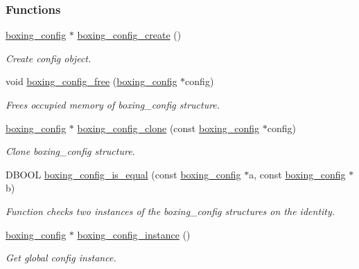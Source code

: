 \subsubsection*{Functions}
\begin{DoxyCompactItemize}
\item 
\hyperlink{structboxing__config__s}{boxing\_\-config} $\ast$ \hyperlink{group__config_ga244626b48bf3730a4a18eaac07be13fd}{boxing\_\-config\_\-create} ()
\begin{DoxyCompactList}\small\item\em Create config object. \item\end{DoxyCompactList}\item 
void \hyperlink{group__config_ga344b21cc581e954c02318d24cc11fb7d}{boxing\_\-config\_\-free} (\hyperlink{structboxing__config__s}{boxing\_\-config} $\ast$config)
\begin{DoxyCompactList}\small\item\em Frees occupied memory of boxing\_\-config structure. \item\end{DoxyCompactList}\item 
\hyperlink{structboxing__config__s}{boxing\_\-config} $\ast$ \hyperlink{group__config_gab662dff6c036f3672b7711191a853868}{boxing\_\-config\_\-clone} (const \hyperlink{structboxing__config__s}{boxing\_\-config} $\ast$config)
\begin{DoxyCompactList}\small\item\em Clone boxing\_\-config structure. \item\end{DoxyCompactList}\item 
DBOOL \hyperlink{group__config_ga4497166dc4bd1fac380e2cc448a0c4c9}{boxing\_\-config\_\-is\_\-equal} (const \hyperlink{structboxing__config__s}{boxing\_\-config} $\ast$a, const \hyperlink{structboxing__config__s}{boxing\_\-config} $\ast$b)
\begin{DoxyCompactList}\small\item\em Function checks two instances of the boxing\_\-config structures on the identity. \item\end{DoxyCompactList}\item 
\hyperlink{structboxing__config__s}{boxing\_\-config} $\ast$ \hyperlink{group__config_ga0290a2c16c8bc625819803b0ce1ef7de}{boxing\_\-config\_\-instance} ()
\begin{DoxyCompactList}\small\item\em Get global config instance. \item\end{DoxyCompactList}\item 

\end{DoxyCompactItemize}

